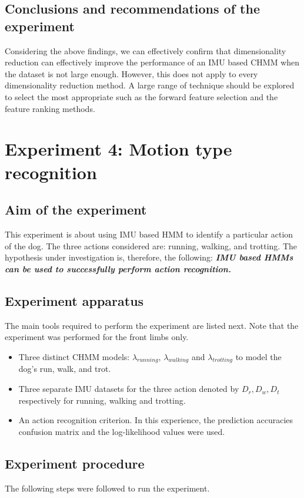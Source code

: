\subsection{Conclusions and recommendations of the experiment}
Considering the above findings, we can effectively confirm that dimensionality reduction can effectively improve the performance of an IMU based CHMM when the dataset is not large enough. However, this does not apply to every dimensionality reduction method. A large range of technique should be explored to select the most appropriate such as the forward feature selection and the feature ranking methods.

\newpage
\section{Experiment 4: Motion type recognition}  \label{exp:motion}

\subsection{Aim of the experiment}
This experiment is about using IMU based HMM to identify a particular action of the dog. The three actions considered are: running, walking, and trotting.
The hypothesis under investigation is, therefore, the following:
\textbf{\textit{IMU based HMMs can be used to successfully perform action recognition.}}

\subsection{Experiment apparatus}
The main tools required to perform the experiment are listed next. Note that the experiment was performed for the front limbs only.
\begin{itemize}
	\item Three distinct CHMM models: \(\lambda_{running}\), \(\lambda_{walking}\) and \(\lambda_{trotting}\) to model the dog's run, walk, and trot.
	\item Three separate IMU datasets for the three action denoted by \(D_r, D_w, D_t\) respectively for running, walking and trotting.
	\item An action recognition criterion. In this experience, the prediction accuracies confusion matrix and the log-likelihood values were used.
\end{itemize}

\subsection{Experiment procedure}
The following steps were followed to run the experiment.

